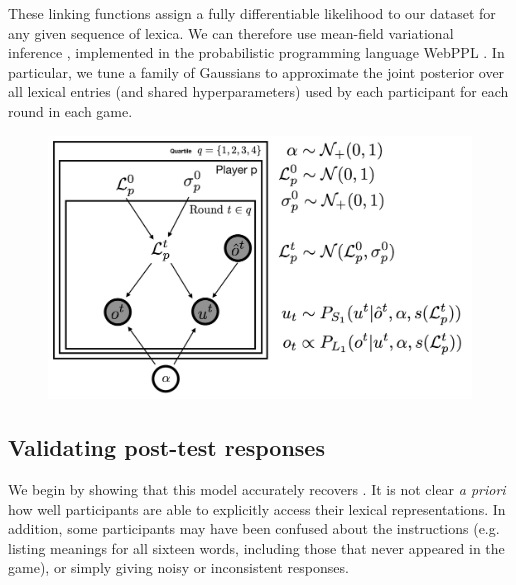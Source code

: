 \documentclass[10pt,letterpaper]{article}
\begin{document}
These linking functions assign a fully differentiable likelihood to our dataset for any given sequence of lexica. We can therefore use mean-field variational inference \cite{RanganathGerrishBlei13_BlackBoxVariationalInference}, implemented in the probabilistic programming language WebPPL \cite{GoodmanStuhlmuller14_DIPPL}. In particular, we tune a family of Gaussians to approximate the joint posterior over all lexical entries (and shared hyperparameters) used by each participant for each round in each game. 

\begin{figure}[t]
\begin{center}
{\includegraphics[scale=.4]{modelSchematic}}
{\caption{{\footnotesize {}    \label{fig:modelSchematic}}}}
\end{center}
\end{figure}

\subsection{Validating post-test responses}

We begin by showing that this model accurately recovers . It is not clear \emph{a priori} how well participants are able to explicitly access their lexical representations. In addition, some participants may have been confused about the instructions (e.g. listing meanings for all sixteen words, including those that never appeared in the game), or simply giving noisy or inconsistent responses. 
\end{document}
